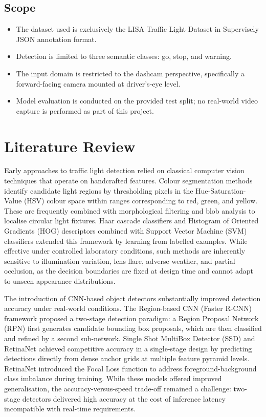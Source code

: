 \subsection{Scope}

\begin{itemize}
    \item The dataset used is exclusively the LISA Traffic Light Dataset in Supervisely JSON annotation format.
    \item Detection is limited to three semantic classes: go, stop, and warning.
    \item The input domain is restricted to the dashcam perspective, specifically a forward-facing camera mounted at driver's-eye level.
    \item Model evaluation is conducted on the provided test split; no real-world video capture is performed as part of this project.
\end{itemize}

\section{Literature Review}

Early approaches to traffic light detection relied on classical computer vision techniques that operate on handcrafted features. Colour segmentation methods identify candidate light regions by thresholding pixels in the Hue-Saturation-Value (HSV) colour space within ranges corresponding to red, green, and yellow. These are frequently combined with morphological filtering and blob analysis to localise circular light fixtures. Haar cascade classifiers and Histogram of Oriented Gradients (HOG) descriptors combined with Support Vector Machine (SVM) classifiers extended this framework by learning from labelled examples. While effective under controlled laboratory conditions, such methods are inherently sensitive to illumination variation, lens flare, adverse weather, and partial occlusion, as the decision boundaries are fixed at design time and cannot adapt to unseen appearance distributions.

The introduction of CNN-based object detectors substantially improved detection accuracy under real-world conditions. The Region-based CNN (Faster R-CNN) framework proposed a two-stage detection paradigm: a Region Proposal Network (RPN) first generates candidate bounding box proposals, which are then classified and refined by a second sub-network. Single Shot MultiBox Detector (SSD) and RetinaNet achieved competitive accuracy in a single-stage design by predicting detections directly from dense anchor grids at multiple feature pyramid levels. RetinaNet introduced the Focal Loss function to address foreground-background class imbalance during training. While these models offered improved generalisation, the accuracy-versus-speed trade-off remained a challenge: two-stage detectors delivered high accuracy at the cost of inference latency incompatible with real-time requirements.


